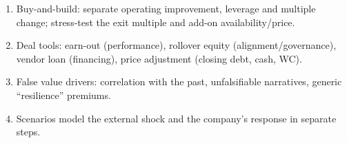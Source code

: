 \begin{trapbox}
\begin{enumerate}[leftmargin=*]
  \item Buy-and-build: separate operating improvement, leverage and multiple change; stress-test the exit multiple and add-on availability/price.
  \item Deal tools: earn-out (performance), rollover equity (alignment/governance), vendor loan (financing), price adjustment (closing debt, cash, WC).
  \item False value drivers: correlation with the past, unfalsifiable narratives, generic ``resilience'' premiums.
  \item Scenarios model the external shock and the company's response in separate steps.
\end{enumerate}
\end{trapbox}
